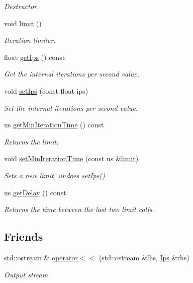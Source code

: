 \begin{DoxyCompactItemize}
\begin{DoxyCompactList}\small\item\em Destructor. \end{DoxyCompactList}\item 
void \hyperlink{classttl_1_1_ips_aaafc0cf5ad267a76b80d2f621226f2de}{limit} ()
\begin{DoxyCompactList}\small\item\em Iteration limiter. \end{DoxyCompactList}\item 
float \hyperlink{classttl_1_1_ips_a50150e4e7db331c971875ee12bff1347}{get\-Ips} () const 
\begin{DoxyCompactList}\small\item\em Get the internal iterations per second value. \end{DoxyCompactList}\item 
void \hyperlink{classttl_1_1_ips_adadff39e454290f724115d437f9ba31b}{set\-Ips} (const float ips)
\begin{DoxyCompactList}\small\item\em Set the internal iterations per second value. \end{DoxyCompactList}\item 
us \hyperlink{classttl_1_1_ips_a2fa079ee56504917d10ccec9efecf0e1}{get\-Min\-Iteration\-Time} () const 
\begin{DoxyCompactList}\small\item\em Returns the limit. \end{DoxyCompactList}\item 
void \hyperlink{classttl_1_1_ips_a8a4677b687a2d209cee8907927e39764}{set\-Min\-Iteration\-Time} (const us \&\hyperlink{classttl_1_1_ips_aaafc0cf5ad267a76b80d2f621226f2de}{limit})
\begin{DoxyCompactList}\small\item\em Sets a new limit, undoes \hyperlink{classttl_1_1_ips_adadff39e454290f724115d437f9ba31b}{set\-Ips()} \end{DoxyCompactList}\item 
us \hyperlink{classttl_1_1_ips_ae947ce62e9eca19c0f126fb4b9e07edb}{get\-Delay} () const 
\begin{DoxyCompactList}\small\item\em Returns the time between the last two limit calls. \end{DoxyCompactList}\end{DoxyCompactItemize}
\subsection*{Friends}
\begin{DoxyCompactItemize}
\item 
std\-::ostream \& \hyperlink{classttl_1_1_ips_a39754746cccd2c1c8c451b3798fc9a20}{operator$<$$<$} (std\-::ostream \&lhs, \hyperlink{classttl_1_1_ips}{Ips} \&rhs)
\begin{DoxyCompactList}\small\item\em Output stream. \end{DoxyCompactList}\end{DoxyCompactItemize}


